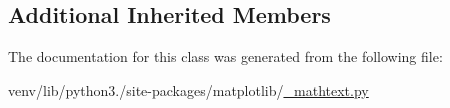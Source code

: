 \subsection*{Additional Inherited Members}


The documentation for this class was generated from the following file\+:\begin{DoxyCompactItemize}
\item 
venv/lib/python3./site-\/packages/matplotlib/\hyperlink{__mathtext_8py}{\+\_\+mathtext.\+py}\end{DoxyCompactItemize}
